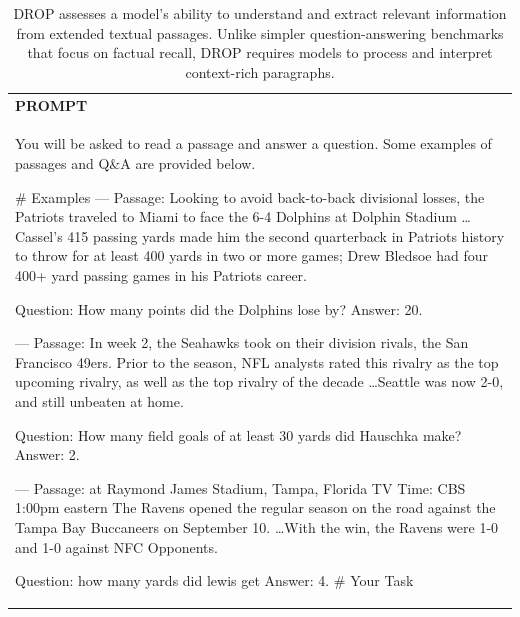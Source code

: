 \begin{table}[h]
    \centering \small
        \caption{DROP assesses a model's ability to understand and extract relevant information from extended textual passages. Unlike simpler question-answering benchmarks that focus on factual recall, DROP requires models to process and interpret context-rich paragraphs. }
    \label{tab:drop_eval_format_example}
    \begin{tabular}{p{}}
    \hline
    \textbf{PROMPT}\\
    You will be asked to read a passage and answer a question. Some examples of passages and Q\&A are provided below. 

\# Examples  
---
Passage:  Looking to avoid back-to-back divisional losses, the Patriots traveled to Miami to face the 6-4 Dolphins at Dolphin Stadium \ldots Cassel's 415 passing yards made him the second quarterback in Patriots history to throw for at least 400 yards in two or more games; Drew Bledsoe had four 400+ yard passing games in his Patriots career.

Question: How many points did the Dolphins lose by?
Answer: 20.

---
Passage:  In week 2, the Seahawks took on their division rivals, the San Francisco 49ers. Prior to the season, NFL analysts rated this rivalry as the top upcoming rivalry, as well as the top rivalry of the decade \ldots Seattle was now 2-0, and still unbeaten at home.

Question: How many field goals of at least 30 yards did Hauschka make?
Answer: 2.

---
Passage:  at Raymond James Stadium, Tampa, Florida TV Time: CBS 1:00pm eastern The Ravens opened the regular season on the road against the Tampa Bay Buccaneers on September 10. \ldots With the win, the Ravens were 1-0 and 1-0 against NFC Opponents.

Question: how many yards did lewis get
Answer: 4.
\# Your Task


\end{tabular}
\end{table}
